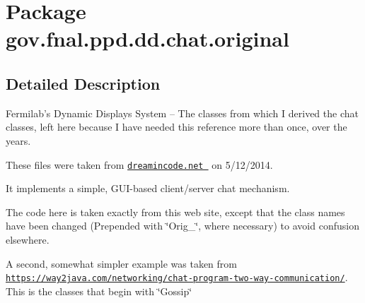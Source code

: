\hypertarget{namespacegov_1_1fnal_1_1ppd_1_1dd_1_1chat_1_1original}{\section{Package gov.\-fnal.\-ppd.\-dd.\-chat.\-original}
\label{namespacegov_1_1fnal_1_1ppd_1_1dd_1_1chat_1_1original}
}


\subsection{Detailed Description}
Fermilab's Dynamic Displays System -- The classes from which I derived the chat classes, left here because I have needed this reference more than once, over the years. 

These files were taken from \href{http://www.dreamincode.net/forums/topic/259777-a-simple-chat-program-with-clientserver-gui-optional/}{\tt dreamincode.\-net } on 5/12/2014.

It implements a simple, G\-U\-I-\/based client/server chat mechanism. 

The code here is taken exactly from this web site, except that the class names have been changed (Prepended with \char`\"{}\-Orig\-\_\-\char`\"{}, where necessary) to avoid confusion elsewhere. 

A second, somewhat simpler example was taken from \href{https://way2java.com/networking/chat-program-two-way-communication/}{\tt https\-://way2java.\-com/networking/chat-\/program-\/two-\/way-\/communication/}. This is the classes that begin with \char`\"{}\-Gossip\char`\"{} 

